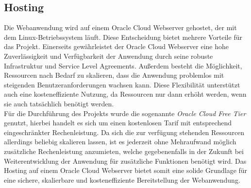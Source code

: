 \documentclass[conference]{IEEEtran}
\begin{document}
\subsection{Hosting}
Die Webanwendung wird auf einem Oracle Cloud Webserver gehostet, der mit dem Linux-Betriebssystem läuft. Diese Entscheidung bietet mehrere Vorteile für das Projekt. Einerseits gewährleistet der Oracle Cloud Webserver eine hohe Zuverlässigkeit und Verfügbarkeit der Anwendung durch seine robuste Infrastruktur und Service Level Agreements. Außerdem besteht die Möglichkeit, Ressourcen nach Bedarf zu skalieren, dass die Anwendung problemlos mit steigenden Benutzeranforderungen wachsen kann. Diese Flexibilität unterstützt auch eine kosteneffiziente Nutzung, da Ressourcen nur dann erhöht werden, wenn sie auch tatsächlich benötigt werden. \\
Für die Durchführung des Projekts wurde die sogenannte \textit{Oracle Cloud Free Tier} genutzt, hierbei handelt es sich um einen kostenlosen Tarif mit entsprechend eingeschränkter Rechenleistung. Da sich die zur verfügung stehenden Ressourcen allerdings beliebig skalieren lassen, ist es jederzeit ohne Mehraufwand möglich zusätzliche Rechenleistung anzumieten, welche gegebenenfalls in der Zukunft bei Weiterentwicklung der Anwendung für zusätzliche Funktionen benötigt wird. Das Hosting auf einem Oracle Cloud Webserver bietet somit eine solide Grundlage für eine sichere, skalierbare und kosteneffiziente Bereitstellung der Webanwendung. \\
\end{document}
